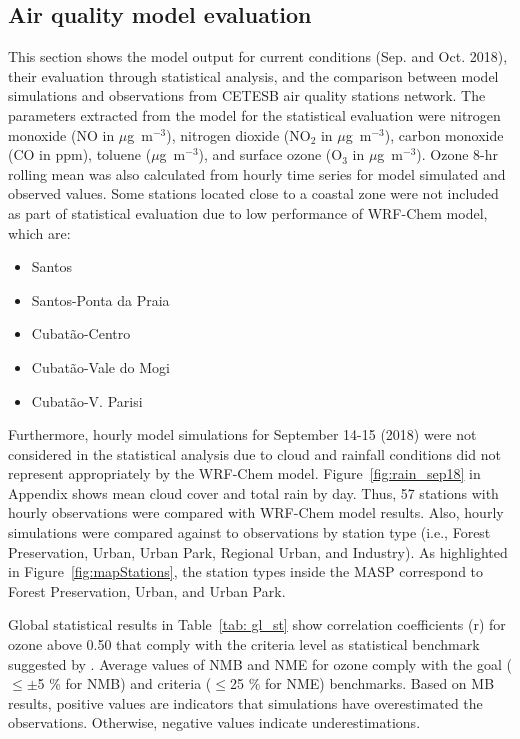   \subsection{Air quality model evaluation} \label{subsec:res_aq}
  This section shows the model output for current conditions (Sep. and Oct. 2018), their evaluation through statistical analysis, and the comparison between model simulations and observations from CETESB air quality stations network.
  The parameters extracted from the model for the statistical evaluation were nitrogen monoxide (NO in $\mu$g~m$^{-3}$), nitrogen dioxide (NO$_2$ in $\mu$g~m$^{-3}$), carbon monoxide (CO in ppm), toluene ($\mu$g~m$^{-3}$), and surface ozone (O$_3$ in $\mu$g~m$^{-3}$).
   Ozone 8-hr rolling mean was also calculated from hourly time series for model simulated and observed values.
   Some stations located close to a coastal zone were not included as part of statistical evaluation due to low performance of WRF-Chem model, which are:
   
   \begin{itemize}
   	\item Santos
   	\item Santos-Ponta da Praia
   	\item Cubat\~{a}o-Centro
   	\item Cubat\~{a}o-Vale do Mogi
   	\item Cubat\~{a}o-V. Parisi
   \end{itemize}
   
   Furthermore, hourly model simulations for September 14-15 (2018) were not considered in the statistical analysis due to cloud and rainfall conditions did not represent appropriately by the WRF-Chem model.
   Figure~\ref{fig:rain_sep18} in Appendix shows mean cloud cover and total rain by day.
   Thus, 57 stations with hourly observations were compared with WRF-Chem model results. Also, hourly simulations were compared against to observations by station type (i.e., Forest Preservation, Urban, Urban Park, Regional Urban, and Industry).
   As highlighted in Figure~\ref{fig:mapStations}, the station types inside the MASP correspond to Forest Preservation, Urban, and Urban Park.

  Global statistical results in Table~\ref{tab: gl_st} show correlation coefficients (r) for ozone  above 0.50 that comply with the criteria level as statistical benchmark suggested by \citet{Emery2017}.
  Average values of NMB and NME for ozone comply with the goal ($\leq\pm$5 \% for NMB) and criteria ($\leq$25 \% for NME) benchmarks.
  Based on MB results, positive values are indicators that simulations have overestimated the observations.
  Otherwise, negative values indicate underestimations.
  
